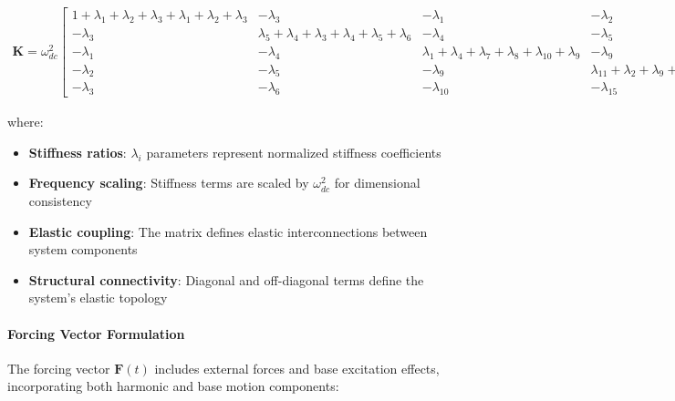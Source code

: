 \documentclass[12pt,a4paper]{article}
\begin{document}
\begin{align}\label{Eq.stiffness.matrix.2dof3dof}
    \mathbf{K} = \omega_{dc}^2 \begin{bmatrix}
        1 + \lambda_1 + \lambda_2 + \lambda_3 + \lambda_1 + \lambda_2 + \lambda_3 & -\lambda_3 & -\lambda_1 & -\lambda_2 & -\lambda_3 \\
        -\lambda_3 & \lambda_5 + \lambda_4 + \lambda_3 + \lambda_4 + \lambda_5 + \lambda_6 & -\lambda_4 & -\lambda_5 & -\lambda_6 \\
        -\lambda_1 & -\lambda_4 & \lambda_1 + \lambda_4 + \lambda_7 + \lambda_8 + \lambda_{10} + \lambda_9 & -\lambda_9 & -\lambda_{10} \\
        -\lambda_2 & -\lambda_5 & -\lambda_9 & \lambda_{11} + \lambda_2 + \lambda_9 + \lambda_{12} + \lambda_5 + \lambda_{15} & -\lambda_{15} \\
        -\lambda_3 & -\lambda_6 & -\lambda_{10} & -\lambda_{15} & \lambda_{14} + \lambda_6 + \lambda_{13} + \lambda_3 + \lambda_{15} + \lambda_{10}
    \end{bmatrix}
\end{align}

where:
\begin{itemize}
    \item \textbf{Stiffness ratios}: $\lambda_i$ parameters represent normalized stiffness coefficients
    \item \textbf{Frequency scaling}: Stiffness terms are scaled by $\omega_{dc}^2$ for dimensional consistency
    \item \textbf{Elastic coupling}: The matrix defines elastic interconnections between system components
    \item \textbf{Structural connectivity}: Diagonal and off-diagonal terms define the system's elastic topology
\end{itemize}

\paragraph{Forcing Vector Formulation}

The forcing vector $\mathbf{F}(t)$ includes external forces and base excitation effects, incorporating both harmonic and base motion components:
\end{document}
